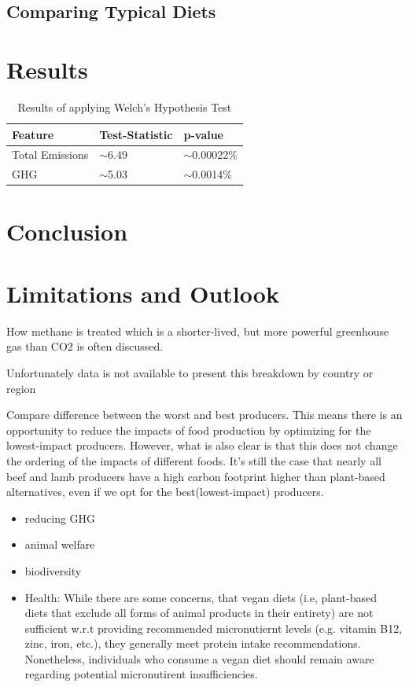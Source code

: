 \documentclass{article}
\begin{document}
\subsection{Comparing Typical Diets}
\section{Results}
\begin{table} \label{tbl:results}
  \caption{Results of applying Welch's Hypothesis Test}
  \label{sample-table}
  \centering
  \begin{tabular}{lll}
    \toprule
    Feature     & Test-Statistic   & p-value  \\
    \midrule
    Total Emissions &$\sim$6.49  & $\sim$0.00022\%    \\
    GHG     & $\sim$5.03   & $\sim$0.0014\%   \\
    \bottomrule
  \end{tabular}
\end{table}

\section{Conclusion}
\label{conclusion}


\section{Limitations and Outlook}
\label{limitations}
How methane is treated which is a shorter-lived, but more powerful greenhouse gas than CO2  is often discussed.

Unfortunately data is not available to present this breakdown by country or region

Compare difference between the worst and best producers. This means there is an opportunity to reduce the impacts of food production by optimizing for the lowest-impact producers. However, what is also clear is that this does not change the ordering of the impacts of different foods. It's still the case that nearly all beef and lamb producers have a high carbon footprint higher than plant-based alternatives, even if we opt for the best(lowest-impact) producers.
\begin{itemize}
  \item reducing GHG
  \item animal welfare
  \item biodiversity
  \item Health: While there are some concerns, that vegan diets (i.e, plant-based diets that exclude all forms of animal products in their entirety) are not sufficient w.r.t providing recommended micronutiernt levels (e.g. vitamin B12, zinc, iron, etc.), they generally meet protein intake recommendations. Nonetheless, individuals who consume a vegan diet should remain aware regarding potential micronutirent insufficiencies. 
  \end{itemize}
  
{\small


}
\end{document}
